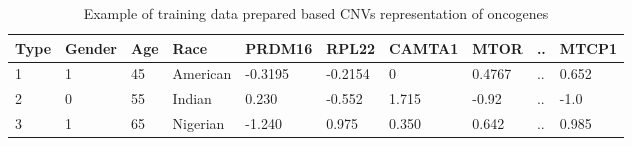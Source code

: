 
\vspace{-2mm}
\begin{table} [!ht]
    \caption{Example of training data prepared based CNVs representation of oncogenes}
    \label{cnv:changed232d}
    \vspace{-6mm}
    \begin{center}
        \scriptsize
        \begin{tabular}{l|l|l| l|l|l|l|l|l|l}
            \hline
            \rowcolor{Gray}
            \textbf{Type} & \textbf{Gender} & Age & Race & \textbf{PRDM16} & \textbf{RPL22} & \textbf{CAMTA1} & \textbf{MTOR} & .. & \textbf{MTCP1} \\\hline    
            1 & 1 & 45 & American & -0.3195 & -0.2154 & 0 & 0.4767  & .. & 0.652 \\\hline
            2 & 0 & 55 & Indian & 0.230 & -0.552 & 1.715 & -0.92  & .. & -1.0 \\\hline
            3 & 1 & 65 & Nigerian & -1.240 & 0.975 & 0.350 & 0.642  & .. & 0.985 \\\hline
        \end{tabular}
        \vspace{-6mm}
    \end{center}
\end{table}
\vspace{-3mm}


